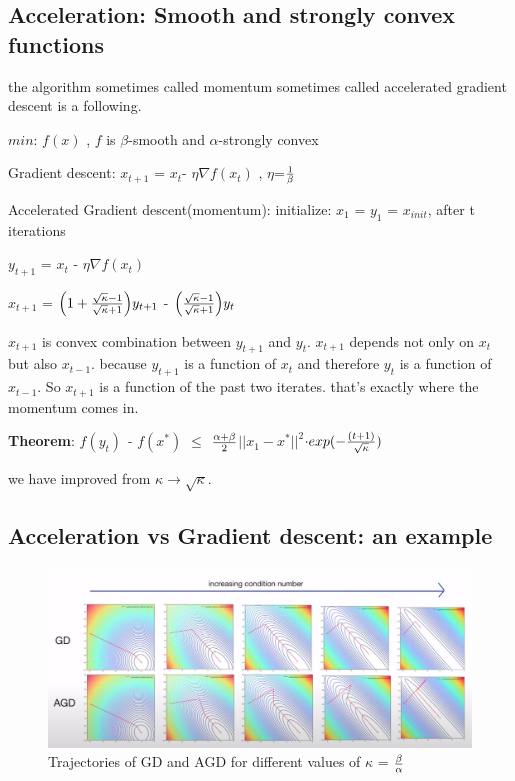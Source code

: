 \documentclass[twoside]{article}
\begin{document}
\subsection{Acceleration: Smooth and strongly convex functions}

the algorithm sometimes called momentum sometimes called accelerated gradient descent is a following.
\begin{center}
$min$: $f(x)$ , $f$ is $\beta$-smooth and $\alpha$-strongly convex

Gradient descent: $x_{t+1}$ = $x_t$- ${\eta}$${\nabla}$$f(x_t)$ , ${\eta}$=${1 \over \beta}$

Accelerated Gradient descent(momentum): initialize: $x_1$ = $y_1$ = $x_{init}$, after t iterations

 $y_{t+1}$ = $x_t$ - $\eta$$\nabla{f(x_t)}$
 
 $x_{t+1}$ = ${\left(1+{\sqrt{\kappa}-1 \over \sqrt{\kappa}+1}\right)}y_{t+1}$ - ${\left({\sqrt{\kappa}-1 \over \sqrt{\kappa}+1}\right)}y_{t}$ 

\end{center}

 $x_{t+1}$ is convex combination between $y_{t+1}$ and $y_t$. $x_{t+1}$ depends not only on $x_t$ but also $x_{t-1}$. because $y_{t+1}$ is a function of $x_{t}$ and therefore $y_{t}$ is a function of $x_{t-1}$. So $x_{t+1}$ is a function of the past two iterates. that's exactly where the momentum comes in.

 {\bf Theorem}: {\it $f(y_t)$ - $f(x^*)$ $\leq$ ${\alpha+\beta \over 2}$$||x_1-x^*||^2$$\cdot{exp(-{(t+1)\over{\sqrt{\kappa}}})}$}

 we have improved from $\kappa \rightarrow \sqrt{\kappa}$.
\subsection{Acceleration vs Gradient descent: an example}

\begin{figure}[h] %
\begin{center}
\includegraphics[width=1.0\linewidth]{fig1.png}
\end{center}
\caption{Trajectories of GD and AGD for different values of $\kappa$ = $\beta \over \alpha$}
\label{fig:long}
\label{fig:onecol}

\end{figure}
\end{document}
